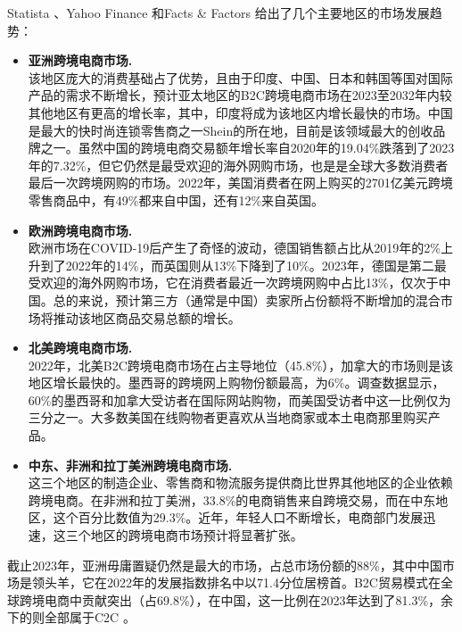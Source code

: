 \documentclass[12pt]{ctexart}
\begin{document}
Statista \cite{6}、Yahoo Finance \cite{7}和Facts \& Factors \cite{9}给出了几个主要地区的市场发展趋势：
\begin{itemize}
    \item \textbf{亚洲跨境电商市场.} \\
    该地区庞大的消费基础占了优势，且由于印度、中国、日本和韩国等国对国际产品的需求不断增长，预计亚太地区的B2C跨境电商市场在2023至2032年内较其他地区有更高的增长率，其中，印度将成为该地区内增长最快的市场。中国是最大的快时尚连锁零售商之一Shein的所在地，目前是该领域最大的创收品牌之一。虽然中国的跨境电商交易额年增长率自2020年的19.04\%跌落到了2023年的7.32\%，但它仍然是最受欢迎的海外网购市场，也是是全球大多数消费者最后一次跨境网购的市场。2022年，美国消费者在网上购买的2701亿美元跨境零售商品中，有49\%都来自中国，还有12\%来自英国。
    
    \item \textbf{欧洲跨境电商市场.} \\
    欧洲市场在COVID-19后产生了奇怪的波动，德国销售额占比从2019年的2\%上升到了2022年的14\%，而英国则从13\%下降到了10\%。2023年，德国是第二最受欢迎的海外网购市场，它在消费者最近一次跨境网购中占比13\%，仅次于中国。总的来说，预计第三方（通常是中国）卖家所占份额将不断增加的混合市场将推动该地区商品交易总额的增长。

    \item \textbf{北美跨境电商市场.} \\
    2022年，北美B2C跨境电商市场在占主导地位（45.8\%），加拿大的市场则是该地区增长最快的。墨西哥的跨境网上购物份额最高，为6\%。调查数据显示，60\%的墨西哥和加拿大受访者在国际网站购物，而美国受访者中这一比例仅为三分之一。大多数美国在线购物者更喜欢从当地商家或本土电商那里购买产品。

    \item \textbf{中东、非洲和拉丁美洲跨境电商市场.} \\
    这三个地区的制造企业、零售商和物流服务提供商比世界其他地区的企业依赖跨境电商。在非洲和拉丁美洲，33.8\%的电商销售来自跨境交易，而在中东地区，这个百分比数值为29.3\%。近年，年轻人口不断增长，电商部门发展迅速，这三个地区的跨境电商市场预计将显著扩张。
    
\end{itemize}

截止2023年，亚洲毋庸置疑仍然是最大的市场，占总市场份额的88\%，其中中国市场是领头羊，它在2022年的发展指数排名中以71.4分位居榜首\cite{7}。B2C贸易模式在全球跨境电商中贡献突出（占69.8\%），在中国，这一比例在2023年达到了81.3\%，余下的则全部属于C2C \cite{6}。
\end{document}
